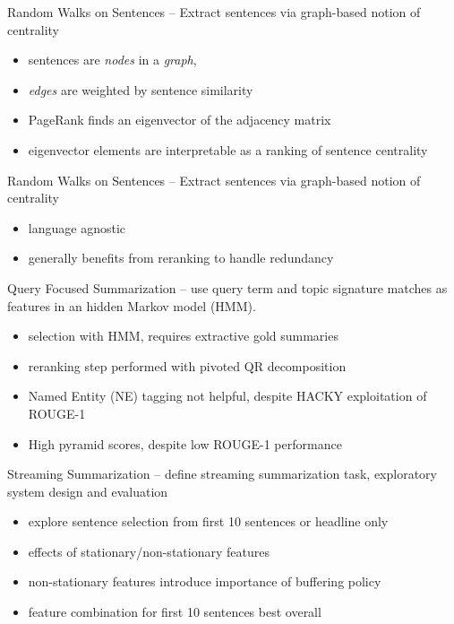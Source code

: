 \documentclass{beamer}
\begin{document}
\begin{frame}{Random Walks on Sentences}
\cite{erkan2004lexrank} -- Extract sentences via graph-based notion of 
    centrality
\begin{itemize}
\item sentences are \textit{nodes} in a \textit{graph}, 
\item \textit{edges} are weighted by sentence similarity
\item PageRank finds an eigenvector of the adjacency matrix
\item eigenvector elements are interpretable as a ranking of sentence centrality
\end{itemize}
\end{frame}

\begin{frame}{Random Walks on Sentences}
\cite{erkan2004lexrank} -- Extract sentences via graph-based notion of 
    centrality
\begin{itemize}
\item language agnostic
\item generally benefits from reranking to handle redundancy
\end{itemize}
\end{frame}

\begin{frame}{Query Focused Summarization}
\cite{conroy2005classy} -- use query term and topic signature matches as 
    features in an hidden Markov model (HMM).
\begin{itemize}
\item selection with HMM, requires extractive gold summaries
\item reranking step performed with pivoted QR decomposition
\item Named Entity (NE) tagging not helpful, despite HACKY exploitation of 
    ROUGE-1
\item High pyramid scores, despite low ROUGE-1 performance
\end{itemize}
\end{frame}


\begin{frame}{Streaming Summarization}
\cite{guo2013updating} -- define streaming summarization task, exploratory
    system design and evaluation
\begin{itemize}
\item explore sentence selection from first 10 sentences or headline only
\item effects of stationary/non-stationary features
\item non-stationary features introduce importance of buffering policy
\item feature combination for first 10 sentences best overall
\end{itemize}
\end{frame}
\end{document}
